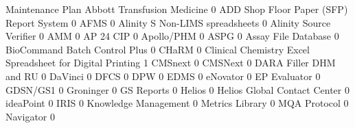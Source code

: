 \documentclass{article}
\begin{document}
\begin{Schunk}
\begin{Soutput}
                                                            Maintenance Plan
  Abbott Transfusion Medicine                                              0
  ADD Shop Floor Paper (SFP) Report System                                 0
  AFMS                                                                     0
  Alinity S Non-LIMS spreadsheets                                          0
  Alinity Source Verifier                                                  0
  AMM                                                                      0
  AP 24 CIP                                                                0
  Apollo/PHM                                                               0
  ASPG                                                                     0
  Assay File Database                                                      0
  BioCommand Batch Control Plus                                            0
  CHaRM                                                                    0
  Clinical Chemistry Excel Spreadsheet for Digital Printing                1
  CMSnext                                                                  0
  CMSNext                                                                  0
  DARA Filler DHM and RU                                                   0
  DaVinci                                                                  0
  DFCS                                                                     0
  DPW                                                                      0
  EDMS                                                                     0
  eNovator                                                                 0
  EP Evaluator                                                             0
  GDSN/GS1                                                                 0
  Groninger                                                                0
  GS Reports                                                               0
  Helios                                                                   0
  Helios Global Contact Center                                             0
  ideaPoint                                                                0
  IRIS                                                                     0
  Knowledge Management                                                     0
  Metrics Library                                                          0
  MQA Protocol                                                             0
  Navigator                                                                0

\end{Soutput}
\end{Schunk}
\end{document}
